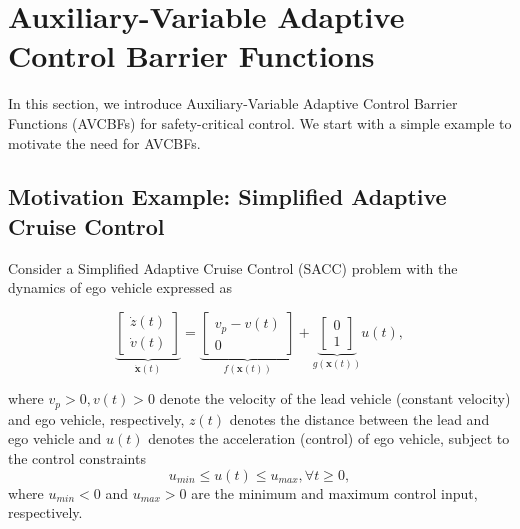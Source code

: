 \section{Auxiliary-Variable Adaptive Control Barrier Functions}
\label{sec:AVBCBF}

In this section, we introduce Auxiliary-Variable Adaptive Control Barrier Functions (AVCBFs) for safety-critical control.
We start with a simple example to motivate the need for AVCBFs.

\subsection{Motivation Example: Simplified Adaptive Cruise Control}
\label{subsec:SACC-problem}

Consider a Simplified Adaptive Cruise Control (SACC) problem with the dynamics of ego vehicle expressed as 
\begin{small}
\begin{equation}
\label{eq:SACC-dynamics}
\underbrace{\begin{bmatrix}
\dot{z}(t) \\
\dot{v}(t) 
\end{bmatrix}}_{\dot{\boldsymbol{x}}(t)}  
=\underbrace{\begin{bmatrix}
 v_{p}-v(t) \\
 0
\end{bmatrix}}_{f(\boldsymbol{x}(t))} 
+ \underbrace{\begin{bmatrix}
  0 \\
  1 
\end{bmatrix}}_{g(\boldsymbol{x}(t))}u(t),
\end{equation}
\end{small}
where $v_{p}>0, v(t)>0$ denote the velocity of the lead vehicle (constant velocity) and ego vehicle, respectively, $z(t)$ denotes the distance between the lead and ego vehicle and $u(t)$ denotes the acceleration (control) of ego vehicle, subject to the control constraints
\begin{equation}
\label{eq:simple-control-constraint}
u_{min}\le u(t) \le u_{max}, \forall t \ge0,
\end{equation}
where $u_{min}<0$ and $u_{max}>0$ are the minimum and maximum control input, respectively.


